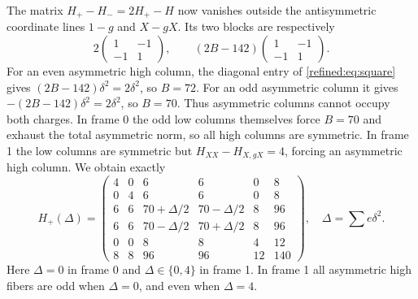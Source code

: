 The matrix $H_+-H_-=2H_+-H$ now vanishes outside the antisymmetric coordinate lines $1-g$ and $X-gX$. Its two blocks are respectively
\[
 2\begin{pmatrix}1&-1\\-1&1\end{pmatrix},\qquad
 (2B-142)\begin{pmatrix}1&-1\\-1&1\end{pmatrix}.
\]
For an even asymmetric high column, the diagonal entry of \eqref{refined:eq:square} gives $(2B-142)\delta^2=2\delta^2$, so $B=72$. For an odd asymmetric column it gives $-(2B-142)\delta^2=2\delta^2$, so $B=70$. Thus asymmetric columns cannot occupy both charges. In frame 0 the odd low columns themselves force $B=70$ and exhaust the total asymmetric norm, so all high columns are symmetric. In frame 1 the low columns are symmetric but $H_{XX}-H_{X,gX}=4$, forcing an asymmetric high column. We obtain exactly
\begin{equation}\label{refined:eq:finalgram}
 H_+(\Delta)=\begin{pmatrix}
 4&0&6&6&0&8\\0&4&6&6&0&8\\
 6&6&70+\Delta/2&70-\Delta/2&8&96\\
 6&6&70-\Delta/2&70+\Delta/2&8&96\\
 0&0&8&8&4&12\\8&8&96&96&12&140
 \end{pmatrix},
 \quad\Delta=\sum e\delta^2.
\end{equation}
Here $\Delta=0$ in frame 0 and $\Delta\in\{0,4\}$ in frame 1. In frame 1 all asymmetric high fibers are odd when $\Delta=0$, and even when $\Delta=4$.

